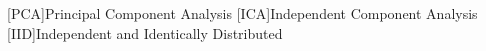 \begin{acronym}[challenge]
    [PCA]{Principal Component Analysis}
    [ICA]{Independent Component Analysis}
    [IID]{Independent and Identically Distributed}
\end{acronym}
